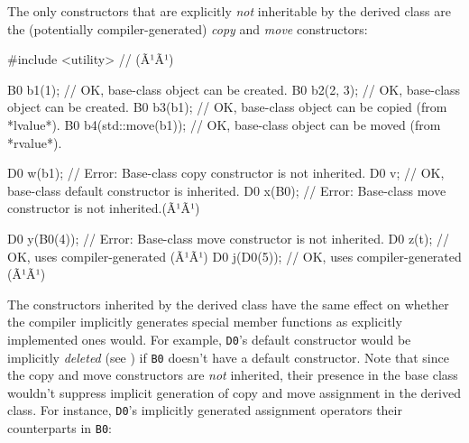\noindent The only constructors that are explicitly \emph{not} inheritable by the
derived class are the (potentially compiler-generated) \emph{copy} and
\emph{move} constructors:

\begin{emcppslisting}[language=C++]
#include <utility>  // (Ã¹{}Ã¹)

B0 b1(1);              // OK, base-class object can be created.
B0 b2(2, 3);           // OK, base-class object can be created.
B0 b3(b1);             // OK, base-class object can be copied (from *lvalue*).
B0 b4(std::move(b1));  // OK, base-class object can be moved (from *rvalue*).

D0 w(b1);    // Error: Base-class copy constructor is not inherited.
D0 v;        // OK, base-class default constructor is inherited.
D0 x(B0{});  // Error: Base-class move constructor is not inherited.(Ã¹{\footnotemark}Ã¹)

D0 y(B0(4));  // Error: Base-class move constructor is not inherited.
D0 z(t);      // OK, uses compiler-generated (Ã¹{}Ã¹)
D0 j(D0(5));  // OK, uses compiler-generated (Ã¹{}Ã¹)
\end{emcppslisting}
{\cprotect{}}
    
\noindent The constructors inherited by the derived class have the same effect on
whether the compiler implicitly generates special member functions as
explicitly implemented ones would. For example, \lstinline!D0!'s default
constructor would be implicitly \emph{deleted} (see ) 
if
\lstinline!B0! doesn't have a default constructor. Note that since the copy
and move constructors are \emph{not} inherited, their presence in the
base class wouldn't suppress implicit generation of copy and move
assignment in the derived class. For instance, \lstinline!D0!'s implicitly
generated assignment operators  their
counterparts in \lstinline!B0!:

